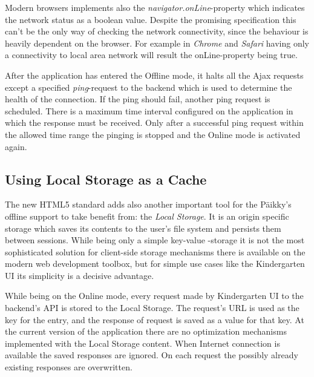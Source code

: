 Modern browsers implements also the \textit{navigator.onLine}-property which indicates the network status as a boolean value. Despite the promising specification this can't be the only way of checking the network connectivity, since the behaviour is heavily dependent on the browser. For example in \textit{Chrome} and \textit{Safari} having only a connectivity to local area network will result the onLine-property being true. \cite{_window.navigator.online_????}

After the application has entered the Offline mode, it halts all the Ajax requests except a specified \textit{ping}-request to the backend which is used to determine the health of the connection. If the ping should fail, another ping request is scheduled. There is a maximum time interval configured on the application in which the response must be received. Only after a successful ping request within the allowed time range the pinging is stopped and the Online mode is activated again.





\subsection{Using Local Storage as a Cache}
\label{subsec:localstorage}


The new HTML5 standard adds also another important tool for the Päikky's offline support to take benefit from: the \textit{Local Storage}. It is an origin specific storage which saves its contents to the user's file system and persists them between sessions. While being only a simple key-value -storage it is not the most sophisticated solution for client-side storage mechanisms there is available on the modern web development toolbox, but for simple use cases like the Kindergarten UI its simplicity is a decisive advantage.

While being on the Online mode, every request made by Kindergarten UI to the backend's API is stored to the Local Storage. The request's URL is used as the key for the entry, and the response of request is saved as a value for that key. At the current version of the application there are no optimization mechanisms implemented with the Local Storage content. When Internet connection is available the saved responses are ignored. On each request the possibly already existing responses are overwritten.

